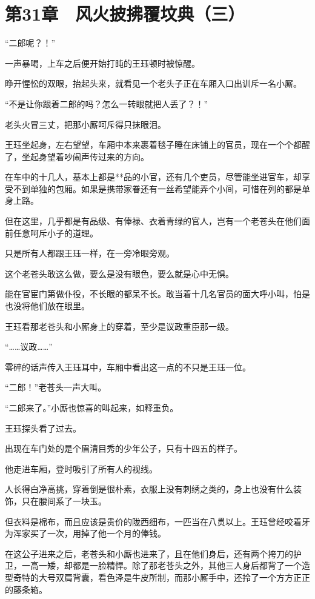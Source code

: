 \section{第31章　风火披拂覆坟典（三）}

“二郎呢？！”

一声暴喝，上车之后便开始打盹的王珏顿时被惊醒。

睁开惺忪的双眼，抬起头来，就看见一个老头子正在车厢入口出训斥一名小厮。

“不是让你跟着二郎的吗？怎么一转眼就把人丢了？！”

老头火冒三丈，把那小厮呵斥得只抹眼泪。

王珏坐起身，左右望望，车厢中本来裹着毯子睡在床铺上的官员，现在一个个都醒了，坐起身望着吵闹声传过来的方向。

在车中的十几人，基本上都是**品的小官，还有几个吏员，尽管能坐进官车，却享受不到单独的包厢。如果是携带家眷还有一丝希望能弄个小间，可惜在列的都是单身上路。

但在这里，几乎都是有品级、有俸禄、衣着青绿的官人，岂有一个老苍头在他们面前任意呵斥小子的道理。

只是所有人都跟王珏一样，在一旁冷眼旁观。

这个老苍头敢这么做，要么是没有眼色，要么就是心中无惧。

能在官宦门第做仆役，不长眼的都呆不长。敢当着十几名官员的面大呼小叫，怕是也没将他们放在眼里。

王珏看那老苍头和小厮身上的穿着，至少是议政重臣那一级。

“……议政……”

零碎的话声传入王珏耳中，车厢中看出这一点的不只是王珏一位。

“二郎！”老苍头一声大叫。

“二郎来了。”小厮也惊喜的叫起来，如释重负。

王珏探头看了过去。

出现在车门处的是个眉清目秀的少年公子，只有十四五的样子。

他走进车厢，登时吸引了所有人的视线。

人长得白净高挑，穿着倒是很朴素，衣服上没有刺绣之类的，身上也没有什么装饰，只在腰间系了一块玉。

但衣料是棉布，而且应该是贵价的陇西细布，一匹当在八贯以上。王珏曾经咬着牙为浑家买了一次，用掉了他一个月的俸钱。

在这公子进来之后，老苍头和小厮也进来了，且在他们身后，还有两个挎刀的护卫，一高一矮，却都是一脸精悍。除了那老苍头之外，其他三人身后都背了一个造型奇特的大号双肩背囊，看色泽是牛皮所制，而那小厮手中，还拎了一个方方正正的藤条箱。

